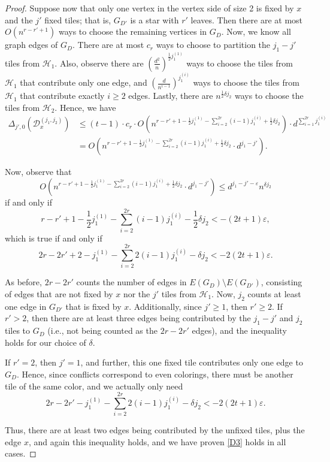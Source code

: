 \documentclass[10pt,a4paper]{amsart}
\newcommand{\cD}{\mathcal{D}}
\newcommand\cH{{\mathcal H}}
\begin{document}
\begin{proof}
    Suppose now that only one vertex in the vertex side of size 2 is fixed by $x$ and the $j'$ fixed tiles; that is, $G_{D'}$ is a star with $r'$ leaves. Then there are at most $O(n^{r-r' +1})$ ways to choose the remaining vertices in $G_D$.  Now, we know all graph edges of $G_D$.  There are at most $c_r$ ways to choose to partition the $j_1 - j'$ tiles from $\cH_1$.  Also, observe there are $\left( \frac{d^2}{n} \right)^{\frac{1}{2} j_1^{(1)}}$ ways to choose the tiles from $\cH_1$ that contribute only one edge, and $\left( \frac{d}{n^{i-1}} \right)^{j_1^{(i)}}$ ways to choose the tiles from $\cH_1$ that contribute exactly $i \geq 2$ edges.  Lastly, there are $n^{\frac{1}{2} \delta j_2}$ ways to choose the tiles from $\cH_2$.  Hence, we have 
\begin{align*}
    \Delta_{j',0} \left( \cD_x^{(j_1,j_2)} \right) 
    &\leq (t-1) \cdot c_r \cdot  O \left( n^{r - r' + 1 - \frac{1}{2} j_1^{(1)} - \sum_{i=2}^{2r} (i-1) j_1^{(i)} + \frac{1}{2} \delta j_2} \right) \cdot d^{\sum_{i=1}^{2r} j_1^{(i)}} \\
    &= O \left( n^{r - r' + 1 - \frac{1}{2} j_1^{(1)} - \sum_{i=2}^{2r} (i-1) j_1^{(i)} + \frac{1}{2} \delta j_2} \cdot d^{j_1 - j'} \right).
\end{align*}


Now, observe that 
$$
    O \left( n^{r - r' + 1 - \frac{1}{2} j_1^{(1)} - \sum_{i=2}^{2r} (i-1) j_1^{(i)} + \frac{1}{2} \delta j_2} \cdot d^{j_1 - j'} \right) \leq d^{j_1 - j' - \varepsilon} n^{\delta j_2}
$$
if and only if 
$$
    r - r' + 1 - \frac{1}{2} j_1^{(1)} - \sum_{i=2}^{2r} (i-1) j_1^{(i)} - \frac{1}{2} \delta j_2 < -(2t+1) \varepsilon,
$$
which is true if and only if 
$$
    2r - 2r' + 2 - j_1^{(1)} - \sum_{i=2}^{2r} 2 (i-1) j_1^{(i)} - \delta j_2 < - 2(2t+1) \varepsilon. 
$$

As before, $2r - 2r'$ counts the number of edges in $E(G_D)\setminus E(G_{D'})$, consisting of edges that are not fixed by $x$ nor the $j'$ tiles from $\cH_1$.  Now, $j_2$ counts at least one edge in $G_{D'}$ that is fixed by $x$.  Additionally, since $j' \geq 1$, then $r' \geq 2$.  If $r' > 2$, then there are at least three edges being contributed by the $j_1 - j'$ and $j_2$ tiles to $G_D$ (i.e., not being counted as the $2r - 2r'$ edges), and the inequality holds for our choice of $\delta$.  


If $r' = 2$, then $j' = 1$, and further, this one fixed tile contributes only one edge to $G_D$.  Hence, since conflicts correspond to even colorings, there must be another tile of the same color, and we actually only need 
$$
    2r - 2r' - j_1^{(1)} - \sum_{i=2}^{2r} 2 (i-1) j_1^{(i)} - \delta j_2 < - 2(2t+1) \varepsilon. 
$$

Thus, there are at least two edges being contributed by the unfixed tiles, plus the edge $x$, and again this inequality holds, and we have proven \ref{D3} holds in all cases.  
\end{proof}
\end{document}
